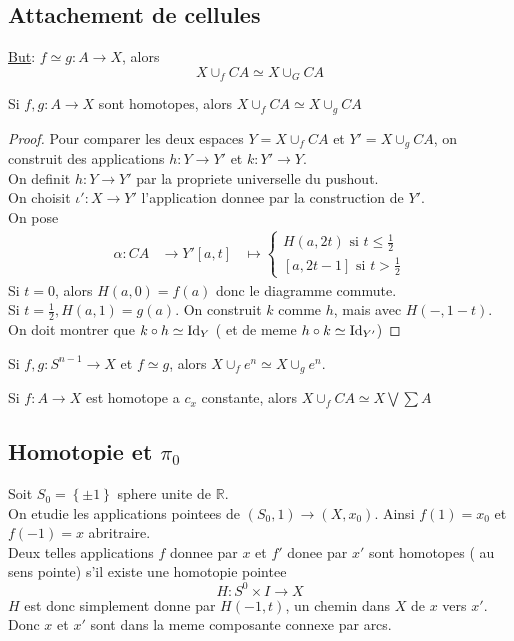 \documentclass[../main.tex]{subfiles}
\begin{document}
\subsection{Attachement de cellules}
\underline{But}: $f\simeq g: A\to X$, alors
\[ 
X\cup_f CA\simeq X\cup_G CA
\]
\begin{propo}
Si $f,g: A\to X$ sont homotopes, alors $X\cup_f CA \simeq X\cup_g CA$ 
\end{propo}
\begin{proof}
Pour comparer les deux espaces $Y= X\cup_f CA$ et $Y' = X\cup_g CA$, on construit des applications $h:Y\to Y'$ et $k:Y'\to Y$.\\
On definit $h:Y\to Y'$ par la propriete universelle du pushout.\\
On choisit $\iota':X\to Y'$ l'application donnee par la construction de $Y'$.\\
On pose 
\begin{align*}
	\alpha: CA&\to Y'
	[ a,t] &\mapsto 
	\begin{cases}
	H( a,2t) \text{ si } t \leq \frac{1}{2}\\
	[ a,2t-1] \text{ si } t >\frac{1}{2}
	\end{cases}
\end{align*}
Si $t=0$, alors $H( a,0) = f( a) $ donc le diagramme commute.\\
Si $t=\frac{1}{2}, H( a,1) = g( a) $. On construit $k$ comme $h$, mais avec $H( -, 1-t) $.\\
On doit montrer que $k\circ h \simeq \operatorname{Id}_Y$ ( et de meme $h\circ k\simeq \operatorname{Id}_{Y'} $) 
\end{proof}
\begin{crly}
Si $f,g: S^{n-1}\to X$ et $f\simeq g$, alors $X\cup_f e^{n}\simeq X\cup_g e^{n}$.
\end{crly}
\begin{crly}
Si $f:A\to X$ est homotope a $c_x$ constante, alors $X\cup_f CA\simeq X\bigvee \sum A$ 
\end{crly}
\subsection{Homotopie et $\pi_0$ }
Soit $S_0= \left\{ \pm 1 \right\} $ sphere unite de $ \mathbb{R}$.\\
On etudie les applications pointees de $( S_0,1 )\to ( X,x_0) $. Ainsi $f( 1) = x_0$ et $f( -1) = x$ abritraire.\\
Deux telles applications $f$ donnee par $x$ et $f'$ donee par $x'$ sont homotopes ( au sens pointe) s'il existe une homotopie pointee
\[ 
H: S^{0}\times I\to X
\]
$H$ est donc simplement donne par $H( -1,t) $, un chemin dans $X$ de $x$ vers $x'$.\\
Donc $x$ et $x'$ sont dans la meme composante connexe par arcs.
\end{document}

